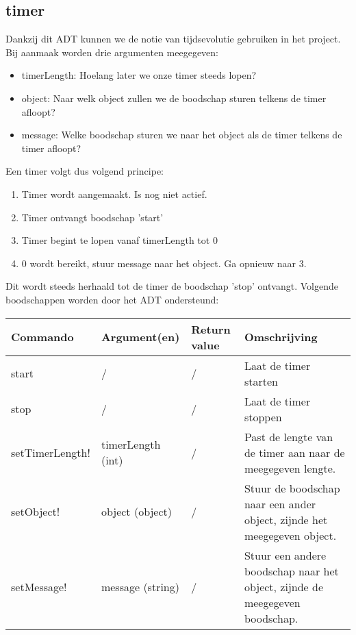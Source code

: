 \documentclass{article}
\begin{document}
\subsection{timer} %
Dankzij dit ADT kunnen we de notie van tijdsevolutie gebruiken in het project. Bij aanmaak worden drie argumenten meegegeven:
\begin{itemize}
  \item timerLength: Hoelang later we onze timer steeds lopen?
  \item object: Naar welk object zullen we de boodschap sturen telkens de timer afloopt?
  \item message: Welke boodschap sturen we naar het object als de timer telkens de timer afloopt?
\end{itemize}
Een timer volgt dus volgend principe:
\begin{enumerate}
  \item Timer wordt aangemaakt. Is nog niet actief.
  \item Timer ontvangt boodschap 'start'
  \item Timer begint te lopen vanaf timerLength tot 0
  \item 0 wordt bereikt, stuur message naar het object. Ga opnieuw naar 3.
\end{enumerate}
Dit wordt steeds herhaald tot de timer de boodschap 'stop' ontvangt. Volgende boodschappen worden door het ADT ondersteund:
\begin{center}
    \begin{tabular}{ | l | l | l | p{8cm} |}
    \hline
    Commando & Argument(en) & Return value & Omschrijving \\ \hline
    start & / & / & Laat de timer starten \\ \hline
    stop & / & / & Laat de timer stoppen \\ \hline
    setTimerLength! & timerLength (int) & / & Past de lengte van de timer aan naar de meegegeven lengte. \\ \hline
    setObject! & object (object) & / & Stuur de boodschap naar een ander object, zijnde het meegegeven object. \\ \hline
    setMessage! & message (string) & / & Stuur een andere boodschap naar het object, zijnde de meegegeven boodschap. \\ \hline
    \end{tabular}
\end{center}
\end{document}
